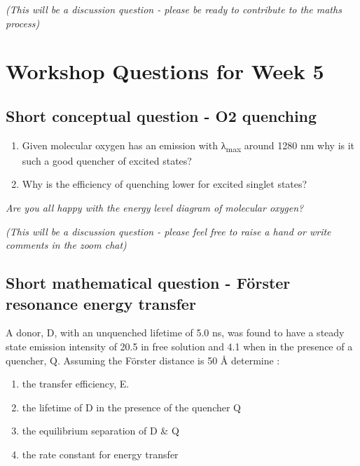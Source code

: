 \documentclass[
]{book}
\providecommand{\tightlist}{%
  \setlength{\itemsep}{0pt}\setlength{\parskip}{0pt}}
\begin{document}
\emph{(This will be a discussion question - please be ready to contribute to the maths process)}

\hypertarget{ch:Workshop5}{%
\chapter{Workshop Questions for Week 5}\label{ch:Workshop5}}

\hypertarget{sec:O2quench}{%
\section{Short conceptual question - O2 quenching}\label{sec:O2quench}}

\begin{enumerate}
\def\labelenumi{\arabic{enumi}.}
\item
  Given molecular oxygen has an emission with λ\textsubscript{max} around 1280 nm why is it such a good quencher of excited states?
\item
  Why is the efficiency of quenching lower for excited singlet states?
\end{enumerate}

\emph{Are you all happy with the energy level diagram of molecular oxygen?}

\emph{(This will be a discussion question - please feel free to raise a hand or write comments in the zoom chat)}

\hypertarget{sec:FRET}{%
\section{Short mathematical question - Förster resonance energy transfer}\label{sec:FRET}}

A donor, D, with an unquenched lifetime of 5.0 ns, was found to have a steady state emission intensity of 20.5 in free solution and 4.1 when in the presence of a quencher, Q. Assuming the Förster distance is 50 Å determine :

\begin{enumerate}
\def\labelenumi{\arabic{enumi}.}
\tightlist
\item
  the transfer efficiency, E.
\item
  the lifetime of D in the presence of the quencher Q
\item
  the equilibrium separation of D \& Q
\item
  the rate constant for energy transfer
\end{enumerate}
\end{document}
